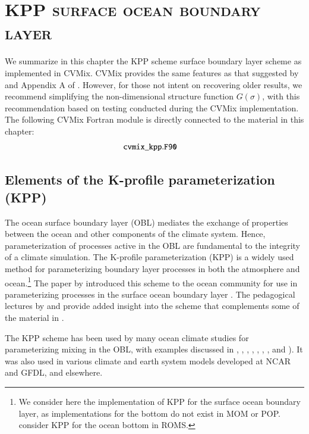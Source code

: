 \chapter{\scshape KPP surface ocean boundary layer}
\label{chapter:cvmix_kpp}

\minitoc
\vspace{.5cm}

\begin{mdframed}[backgroundcolor=lightgray!50]
  We summarize in this chapter the KPP scheme surface boundary layer
  scheme \citep{LargeKPP} as implemented in CVMix.  CVMix provides the
  same features as that suggested by \cite{LargeKPP} and Appendix A of
  \cite{Dana_etal2006}.  However, for those not intent on recovering
  older results, we recommend simplifying the non-dimensional
  structure function $G(\sigma)$, with this recommendation based on
  testing conducted during the CVMix implementation.  The following
  CVMix Fortran module is directly connected to the material in this
  chapter:
\begin{align*} 
 & {\tt cvmix\_kpp.F90}
\end{align*}
\end{mdframed}


\section{Elements of the K-profile parameterization (KPP)}
\label{sec:implementation}

The ocean surface boundary layer (OBL) mediates the exchange of
properties between the ocean and other components of the climate
system. Hence, parameterization of processes active in the OBL are
fundamental to the integrity of a climate simulation. The K-profile
parameterization (KPP) is a widely used method for parameterizing
boundary layer processes in both the atmosphere and ocean.\footnote{We
  consider here the implementation of KPP for the surface ocean
  boundary layer, as implementations for the bottom do not exist in
  MOM or POP.  \citep{Durski_etal2004} consider KPP for the ocean
  bottom in ROMS.} The paper by \cite{LargeKPP} introduced this scheme
to the ocean community for use in parameterizing processes in the
surface ocean boundary layer .  The pedagogical lectures by
\cite{LargeKPP_lectures} and \cite{Large2012} provide added insight
into the scheme that complements some of the material in
\cite{LargeKPP}.

The KPP scheme has been used by many ocean climate studies for
parameterizing mixing in the OBL, with examples discussed in
\cite{Largeforcing}, \cite{HollandChowBryan1998},
\cite{Gent_etal_1998}, \cite{GOTM}, \cite{LiChowMcWilliamsFu2001},
\cite{Smyth_etal2002}, \cite{Durski_etal2004}, and
\cite{Chang_etal2005}).  It was also used in various climate and earth
system models developed at NCAR and GFDL, and elsewhere.  

